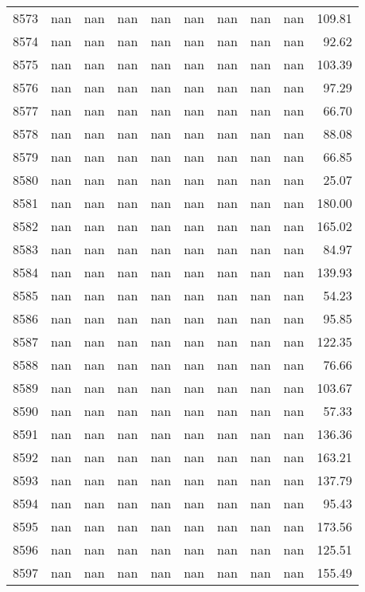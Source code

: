 \begin{tabular}{lrrrrrrrrr}
8573 & nan & nan & nan & nan & nan & nan & nan & nan & 109.81 \\
8574 & nan & nan & nan & nan & nan & nan & nan & nan & 92.62 \\
8575 & nan & nan & nan & nan & nan & nan & nan & nan & 103.39 \\
8576 & nan & nan & nan & nan & nan & nan & nan & nan & 97.29 \\
8577 & nan & nan & nan & nan & nan & nan & nan & nan & 66.70 \\
8578 & nan & nan & nan & nan & nan & nan & nan & nan & 88.08 \\
8579 & nan & nan & nan & nan & nan & nan & nan & nan & 66.85 \\
8580 & nan & nan & nan & nan & nan & nan & nan & nan & 25.07 \\
8581 & nan & nan & nan & nan & nan & nan & nan & nan & 180.00 \\
8582 & nan & nan & nan & nan & nan & nan & nan & nan & 165.02 \\
8583 & nan & nan & nan & nan & nan & nan & nan & nan & 84.97 \\
8584 & nan & nan & nan & nan & nan & nan & nan & nan & 139.93 \\
8585 & nan & nan & nan & nan & nan & nan & nan & nan & 54.23 \\
8586 & nan & nan & nan & nan & nan & nan & nan & nan & 95.85 \\
8587 & nan & nan & nan & nan & nan & nan & nan & nan & 122.35 \\
8588 & nan & nan & nan & nan & nan & nan & nan & nan & 76.66 \\
8589 & nan & nan & nan & nan & nan & nan & nan & nan & 103.67 \\
8590 & nan & nan & nan & nan & nan & nan & nan & nan & 57.33 \\
8591 & nan & nan & nan & nan & nan & nan & nan & nan & 136.36 \\
8592 & nan & nan & nan & nan & nan & nan & nan & nan & 163.21 \\
8593 & nan & nan & nan & nan & nan & nan & nan & nan & 137.79 \\
8594 & nan & nan & nan & nan & nan & nan & nan & nan & 95.43 \\
8595 & nan & nan & nan & nan & nan & nan & nan & nan & 173.56 \\
8596 & nan & nan & nan & nan & nan & nan & nan & nan & 125.51 \\
8597 & nan & nan & nan & nan & nan & nan & nan & nan & 155.49 \\

\end{tabular}
